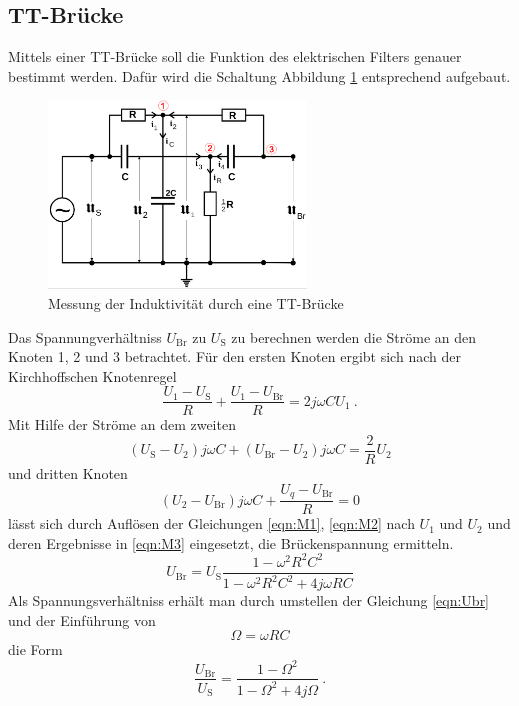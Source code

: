 \subsection{TT-Brücke}
Mittels einer TT-Brücke soll die Funktion des elektrischen Filters genauer bestimmt werden. Dafür wird die Schaltung Abbildung \ref{fig:TT} entsprechend aufgebaut.
\begin{figure}
  \centering
  \includegraphics[height=5cm]{picture/7.png}
  \caption{Messung der Induktivität durch eine TT-Brücke}
  \label{fig:TT}
\end{figure}
Das Spannungverhältniss $U_\text{Br}$ zu $U_\text{S}$ zu berechnen werden die Ströme an den Knoten 1, 2 und 3 betrachtet. Für den ersten Knoten ergibt sich nach der Kirchhoffschen Knotenregel
\begin{equation}
  \frac{U_1 - U_\text{S}}{R} + \frac{U_1 - U_\text{Br}}{R} = 2 j \omega C U_1 \ .
  \label{eqn:M1}
\end{equation}
Mit Hilfe der Ströme an dem zweiten 
\begin{equation}
  \left( U_\text{S} - U_2 \right) j \omega C + \left( U_\text{Br} - U_2 \right)j \omega C = \frac{2}{R} U_2
  \label{eqn:M2}
\end{equation}
und dritten Knoten
\begin{equation}
  \left( U_2 - U_\text{Br} \right)j \omega C + \frac{U_q - U_\text{Br}}{R} = 0
  \label{eqn:M3}
\end{equation}
lässt sich durch Auflösen der Gleichungen \ref{eqn:M1}, \ref{eqn:M2} nach $U_1$ und $U_2$ und deren Ergebnisse in \ref{eqn:M3} eingesetzt, die Brückenspannung ermitteln.
\begin{equation}
  U_\text{Br} = U_\text{S} \frac{1 - \omega^2 R^2 C^2}{1 - \omega^2 R^2 C^2 + 4 j \omega R C}
  \label{eqn:Ubr}
\end{equation}
Als Spannungsverhältniss erhält man durch umstellen der Gleichung \ref{eqn:Ubr} und der Einführung von 
\begin{equation*}
  \Omega = \omega R C
\end{equation*}
die Form 
\begin{equation}
  \frac{U_\text{Br}}{U_\text{S}} = \frac{1 - \Omega^2}{1 - \Omega^2 + 4 j \Omega} \ .
  \label{BrS}
\end{equation}

